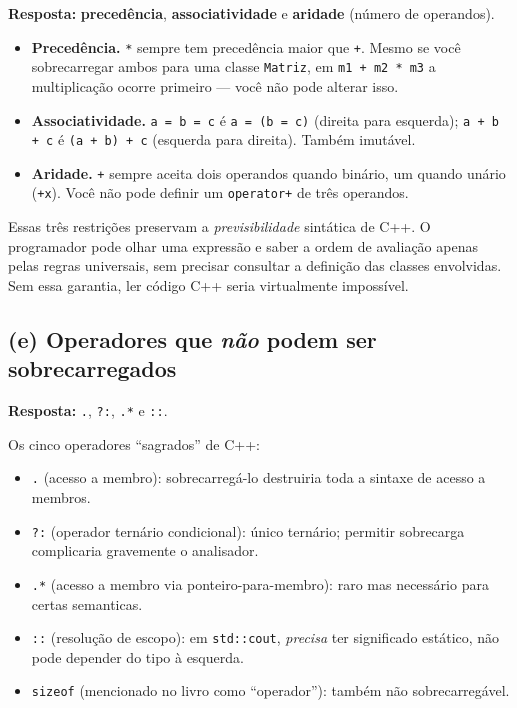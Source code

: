 \documentclass[11pt,a4paper]{article}
\begin{document}
\begin{resposta}\textbf{Resposta:} \textbf{preced\^encia}, \textbf{associatividade} e \textbf{aridade} (n\'umero de operandos).\end{resposta}

\begin{itemize}[leftmargin=*,itemsep=2pt]
  \item \textbf{Preced\^encia.} \texttt{*} sempre tem preced\^encia maior que \texttt{+}. Mesmo se voc\^e sobrecarregar ambos para uma classe \texttt{Matriz}, em \texttt{m1 + m2 * m3} a multiplica\c{c}\~ao ocorre primeiro --- voc\^e n\~ao pode alterar isso.
  \item \textbf{Associatividade.} \texttt{a = b = c} \'e \texttt{a = (b = c)} (direita para esquerda); \texttt{a + b + c} \'e \texttt{(a + b) + c} (esquerda para direita). Tamb\'em imut\'avel.
  \item \textbf{Aridade.} \texttt{+} sempre aceita dois operandos quando bin\'ario, um quando un\'ario (\texttt{+x}). Voc\^e n\~ao pode definir um \texttt{operator+} de tr\^es operandos.
\end{itemize}

\begin{obseng}
Essas tr\^es restri\c{c}\~oes preservam a \emph{previsibilidade} sint\'atica de C++. O programador pode olhar uma express\~ao e saber a ordem de avalia\c{c}\~ao apenas pelas regras universais, sem precisar consultar a defini\c{c}\~ao das classes envolvidas. Sem essa garantia, ler c\'odigo C++ seria virtualmente imposs\'ivel.
\end{obseng}

\subsection*{(e) Operadores que \emph{n\~ao} podem ser sobrecarregados}

\begin{resposta}\textbf{Resposta:} \texttt{.}, \texttt{?:}, \texttt{.*} e \texttt{::}.\end{resposta}

Os cinco operadores ``sagrados'' de C++:

\begin{itemize}[leftmargin=*,itemsep=0pt]
  \item \texttt{.} (acesso a membro): sobrecarreg\'a-lo destruiria toda a sintaxe de acesso a membros.
  \item \texttt{?:} (operador tern\'ario condicional): \'unico tern\'ario; permitir sobrecarga complicaria gravemente o analisador.
  \item \texttt{.*} (acesso a membro via ponteiro-para-membro): raro mas necess\'ario para certas semanticas.
  \item \texttt{::} (resolu\c{c}\~ao de escopo): em \texttt{std::cout}, \emph{precisa} ter significado est\'atico, n\~ao pode depender do tipo \`a esquerda.
  \item \texttt{sizeof} (mencionado no livro como ``operador''): tamb\'em n\~ao sobrecarreg\'avel.
\end{itemize}
\end{document}
